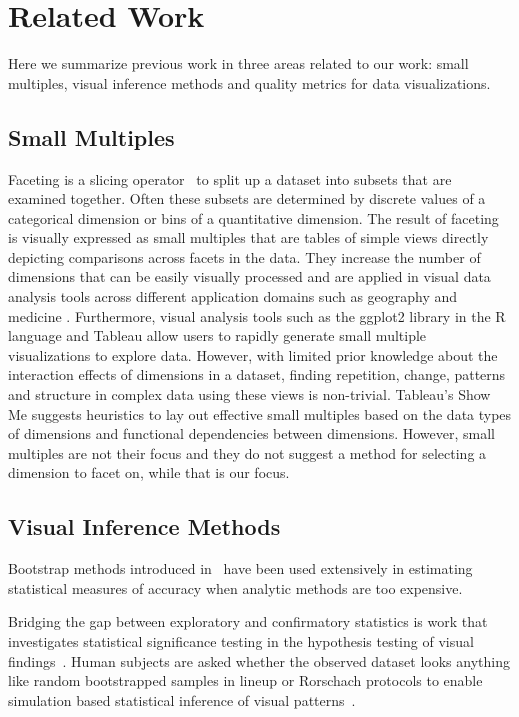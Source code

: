 \section{Related Work}
\label{sec:related}
Here we summarize previous work in three areas related to our work: small multiples, visual inference methods and quality metrics for data visualizations.

\subsection{Small Multiples}
Faceting is a slicing operator~\cite{Wilkinson2005GG, Munzner2014} to split up a dataset into subsets that are examined together. Often these subsets are determined by discrete values of a categorical dimension or bins of a quantitative dimension. The result of faceting is visually expressed as small multiples that are tables of simple views directly depicting comparisons across facets in the data. They increase the number of dimensions that can be easily visually processed and are applied in visual data analysis tools across different application domains such as geography \cite{Guo2006, Maceachren2003} and medicine \cite{Lunzer2010, Sarni2005}. Furthermore, visual analysis tools such as the ggplot2 library in the R language \cite{Wickham2006} and Tableau \cite{Stolte2002} allow users to rapidly generate small multiple visualizations to explore data.  However, with limited prior knowledge about the interaction effects of dimensions in a dataset, finding repetition, change, patterns and structure in complex data using these views is non-trivial. Tableau's Show Me \cite{mackinlay2007} suggests heuristics to lay out effective small multiples based on the data types of dimensions and functional dependencies between dimensions. However, small multiples are not their focus and they do not suggest a method for selecting a dimension to facet on, while that is our focus. 

\subsection{Visual Inference Methods}
Bootstrap methods introduced in~\cite{Efron1979} have been used extensively in estimating statistical measures of accuracy when analytic methods are too expensive. 

Bridging the gap between exploratory and confirmatory statistics is work that investigates statistical significance testing in the hypothesis testing of visual findings~\cite{Wickham2013,Majumder2013}. Human subjects are asked whether the observed dataset looks anything like random bootstrapped samples in lineup or Rorschach protocols to enable simulation based statistical inference of visual patterns~\cite{Buja2009}.

